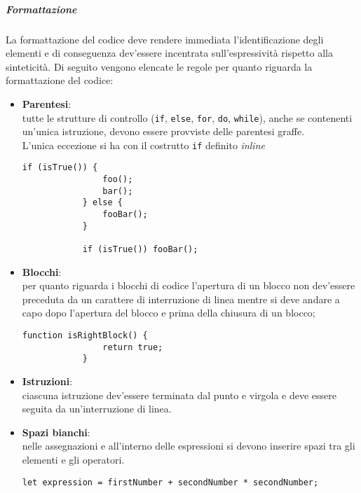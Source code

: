 \subparagraph{Formattazione}

La formattazione del codice deve rendere immediata l'identificazione degli elementi e di conseguenza dev'essere incentrata sull'espressività 
rispetto alla sinteticità.
Di seguito vengono elencate le regole per quanto riguarda la formattazione del codice:
\begin{itemize}
	\item \textbf{Parentesi}:\\
		tutte le strutture di controllo (\texttt{if}, \texttt{else}, \texttt{for}, \texttt{do}, \texttt{while}), anche se contenenti 
		un'unica istruzione, devono essere provviste delle parentesi graffe.\\

		L'unica eccezione si ha con il costrutto \texttt{if} definito \emph{inline}\\

		\begin{lstlisting}[style=htmlcssjs]
			if (isTrue()) {
				foo();
				bar();
			} else {
				fooBar();
			}

			if (isTrue()) fooBar();
		\end{lstlisting}

	\item \textbf{Blocchi}:\\
		per quanto riguarda i blocchi di codice l'apertura di un blocco non dev'essere preceduta da un carattere di interruzione di linea 
		mentre si deve andare a capo dopo l'apertura del blocco e prima della chiusura di un blocco;
		\begin{lstlisting}[style=htmlcssjs]
			function isRightBlock() {
				return true;
			}
		\end{lstlisting}

	\item \textbf{Istruzioni}:\\
		ciascuna istruzione dev'essere terminata dal punto e virgola e deve essere seguita da un'interruzione di linea.

	\item \textbf{Spazi bianchi}:\\
		nelle assegnazioni e all'interno delle espressioni si devono inserire spazi tra gli elementi e gli operatori.
		\begin{lstlisting}[style=htmlcssjs]
			let expression = firstNumber + secondNumber * secondNumber;
		\end{lstlisting}
\end{itemize}

